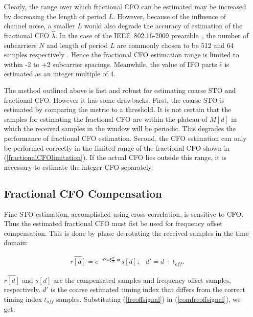 Clearly, the range over which fractional CFO can be estimated may be increased by decreasing the length of period $L$. 
However, because of the influence of channel noise, a smaller $L$ would also degrade the accuracy of estimation of the fractional CFO $\hat{\lambda}$.
In the case of the IEEE~802.16-2009 preamble~\cite{IEEE80216}, the number of subcarriers $N$ and length of period $L$ are commonly chosen to be 512 and 64 samples respectively \cite{Kim2008}. 
Hence the fractional CFO estimation range is limited to within -2 to +2 subcarrier spacings. Meanwhile, the value of IFO parts $\hat{\epsilon}$ is estimated as an integer multiple of 4.

The method outlined above is fast and robust for estimating coarse STO and fractional CFO. 
However it has some drawbacks. 					
First, the coarse STO is estimated by comparing the metric to a threshold. 
It is not certain that the samples for estimating the fractional CFO are within the plateau of $M[d]$ in which the received samples in the window will be periodic.
This degrades the performance of fractional CFO estimation.
Second, the CFO estimation can only be performed correctly in the limited range of the fractional CFO shown in (\ref{fractionalCFOlimitation}). 
If the actual CFO lies outside this range, it is necessary to estimate the integer CFO separately.

\subsection{Fractional CFO Compensation}

Fine STO estimation, accomplished using cross-correlation, is sensitive to CFO. 
Thus the estimated fractional CFO must fist be used for frequency offset compensation.
This is done by phase de-rotating the received samples in the time domain:

\begin{eqnarray}
\label{comfreoffsignal}
\widehat{r[d]} =  e^{-j2\pi\xi \frac{d'}{N}}*s[d];  & d' = d + \mathit{t_{off}}.
\end{eqnarray}

$\widehat{r[d]}$ and $s[d]$ are the compensated samples and frequency offset samples, respectively. $d'$ is the coarse estimated timing index that differs from the correct timing index $\mathit{t_{off}}$ samples.
Substituting (\ref{freoffsignal}) in (\ref{comfreoffsignal}), we get:

